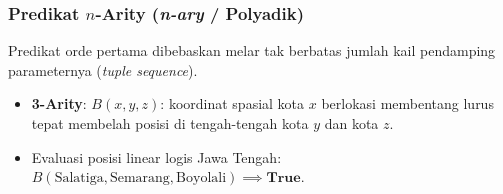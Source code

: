 \subsubsection{Predikat $n$-Arity (\textit{n-ary} / Polyadik)}
Predikat orde pertama dibebaskan melar tak berbatas jumlah kail pendamping parameternya (\textit{tuple sequence}). 
\begin{itemize}
    \item \textbf{3-Arity}: $B(x, y, z)$: koordinat spasial kota $x$ berlokasi membentang lurus tepat membelah posisi di tengah-tengah kota $y$ dan kota $z$.
    \item Evaluasi posisi linear logis Jawa Tengah: $B(\text{Salatiga}, \text{Semarang}, \text{Boyolali}) \implies \textbf{True}$.
\end{itemize}
